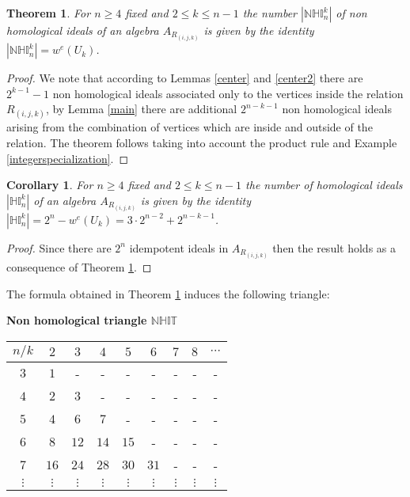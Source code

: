 \documentclass[10pt,twoside]{article}
\newtheorem{teor}{Theorem}
\newtheorem{corol}{Corollary}
\theoremstyle{definition}
\begin{document}
\addtocounter{teor}{10}
\begin{teor} \label{N.H}
For $n\geq 4$ fixed and $2\leq k \leq n-1$ the number $|\mathbb{NHI}_n^k|$ of non homological ideals of an algebra $A_{R_{(i, j, k)}}$ is given by the identity $|\mathbb{NHI}_n^k|=  w^e(U_k)$.


\end{teor}


\begin{proof}
We note that according to Lemmas \ref{center} and \ref{center2} there are $2^{k-1}-1$ non homological ideals associated only to the vertices inside the relation $R_{(i, j, k)}$, by Lemma \ref{main} there are additional $2^{n-k-1}$ non homological ideals arising from the combination of vertices which are inside and outside of the relation. The theorem follows taking into account the product rule and Example \ref{integerspecialization}.
\end{proof}



\addtocounter{corol}{18}
\begin{corol}\label{H.I}
For $n\geq 4$ fixed and $2\leq k \leq n-1$ the number of homological ideals $|\mathbb{HI}_n^k|$ of an algebra $A_{R_{(i, j, k)}}$ is given by the identity $|\mathbb{HI}_n^k|=2^n-w^{e}(U_k)=3\cdot2^{n-2}+2^{n-k-1}$.

\end{corol}
\begin{proof}
Since there are $2^n$ idempotent ideals in $A_{R_{(i, j, k)}}$ then the result holds as a consequence of Theorem \ref{N.H}.
\end{proof}


The formula obtained in Theorem \ref{N.H} induces the following triangle:
\begin{center}
\textbf{Non homological triangle $\mathbb{NHIT}$}
\vspace{0.5cm}  

\begin{tabular}{|c|c|c|c|c|c|c|c|c|}
\hline
$n/k$ & $2$ & $3$ & $4$ & $5$ & $6$ & $7$ & $8$ &$\cdots$\\
\hline
$3$ & $1$ & - & - & - & - & - & - & -\\
\hline
$4$& $2$ & $3$  & - & - & - & - & - &-\\
\hline
$5$ & $4$ & $6$ & $7$  & - & - & - & - &-\\
\hline
$6$& $8$ & $12$ & $14$ & $15$ & - & - & - &-\\
\hline
$7$ & $16$ & $24$ & $28$ & $30$ & $31$ & - & - &-\\
\hline
$\vdots $& $\vdots$ & $\vdots $ & $\vdots $ & $\vdots $ & $\vdots $ & $\vdots $ & $\vdots$& $\vdots$\\
\hline
\end{tabular}


\end{center}
\end{document}
